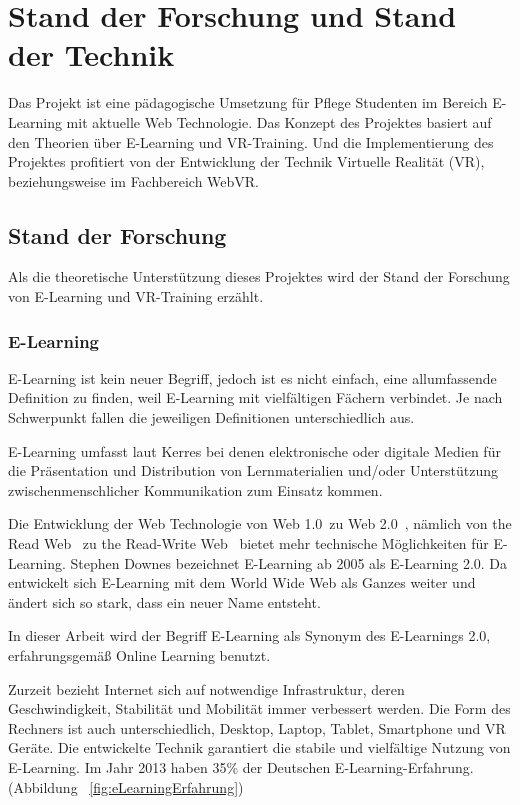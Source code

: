 \chapter{Stand der Forschung und Stand der Technik}

Das Projekt ist eine pädagogische Umsetzung für Pflege Studenten im Bereich E-Learning mit aktuelle Web Technologie. Das Konzept des Projektes basiert auf den Theorien über E-Learning und VR-Training. Und die Implementierung des Projektes profitiert von der Entwicklung der Technik Virtuelle Realität (VR), beziehungsweise im Fachbereich WebVR.

\section{Stand der Forschung}

Als die theoretische Unterstützung dieses Projektes wird der Stand der Forschung von E-Learning und VR-Training erzählt.

 \subsection{E-Learning}
 E-Learning ist kein neuer Begriff, jedoch ist es nicht einfach, eine allumfassende Definition zu finden, weil E-Learning mit vielfältigen Fächern verbindet. Je nach Schwerpunkt fallen die jeweiligen Definitionen unterschiedlich aus.

E-Learning umfasst laut Kerres \citep{1} \glqq bei denen elektronische oder digitale Medien für die Präsentation und Distribution von Lernmaterialien und/oder Unterstützung zwischenmenschlicher Kommunikation zum Einsatz kommen.\grqq

Die Entwicklung der Web Technologie von \glqq Web 1.0\grqq\ zu \glqq Web 2.0\grqq\  \citep{3}, nämlich von \glqq the Read Web \grqq\ zu \glqq the Read-Write Web\grqq\ \citep{4} bietet mehr technische Möglichkeiten für E-Learning. Stephen Downes \citep{2} bezeichnet E-Learning ab 2005 als E-Learning 2.0. Da \glqq entwickelt sich E-Learning mit dem World Wide Web als Ganzes weiter und ändert sich so stark, dass ein neuer Name entsteht.\grqq\

In dieser Arbeit wird der Begriff E-Learning als Synonym des E-Learnings 2.0, erfahrungsgemäß Online Learning benutzt.
 
Zurzeit bezieht Internet sich auf notwendige Infrastruktur, deren Geschwindigkeit, Stabilität und Mobilität immer verbessert werden. Die Form des Rechners ist auch unterschiedlich, Desktop, Laptop, Tablet, Smartphone und VR Geräte. Die entwickelte Technik garantiert die stabile und vielfältige Nutzung von E-Learning. Im Jahr 2013 haben 35\% der Deutschen E-Learning-Erfahrung. (Abbildung ~\ref{fig:eLearningErfahrung})

